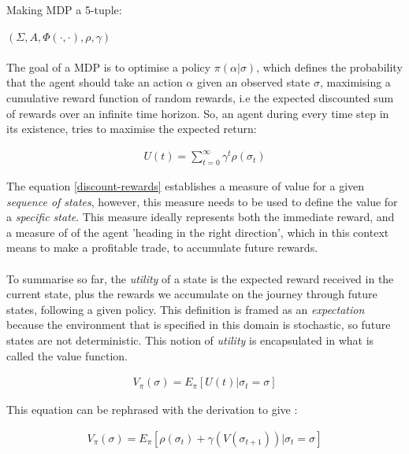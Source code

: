 \documentclass[ %
                    author={Ashwinder Khurana},
                supervisor={Prof Dave Cliff},
                    degree={MEng},
                     title={The Deeply Reinforced Trader},
                  subtitle={},
                      type={enterprise},
                      year={2020} ]{dissertation}
\begin{document}
Making MDP a 5-tuple:{$(\Sigma,A, \Phi(\cdot , \cdot), \rho,\gamma)$
\\
\\

\noindent
The goal of a MDP is to optimise a policy $\pi(\alpha | \sigma)$, which defines the probability that the agent should take an action $\alpha$ given an observed state $\sigma$, maximising a cumulative reward function of random rewards, i.e the expected discounted sum of rewards over an infinite time horizon. So, an agent during every time step in its existence, tries to maximise the expected return:

\begin{equation}
\label{discount-rewards}
\begin{split}
U(t) = \sum\limits^{\infty}_{t=0}{\gamma^{t} \rho(\sigma_t)}
\end{split}
\end{equation}

\vspace{0.5cm}
\noindent
The equation \ref{discount-rewards} establishes a measure of value for a given \textit{sequence of states}, however, this measure needs to be used to define the value for a \textit{specific state}. This measure ideally represents both the immediate reward, and a measure of of the agent 'heading in the right direction', which in this context means to make a profitable trade, to accumulate future rewards.
\\
\\
To summarise so far, the \textit{utility} of a state is the expected reward received in the current state, plus the rewards we accumulate on the journey through future states, following a given policy. This definition is framed as an \textit{expectation} because the environment that is specified in this domain is stochastic, so future states are not deterministic. This notion of \textit{utility} is encapsulated in what is called the value function. 

\begin{equation}
\label{expected-discounted-rewards}
\begin{split}
V_\pi (\sigma) = E_\pi [U(t) | \sigma_t = \sigma]
\end{split}
\end{equation}

\noindent 
This equation can be rephrased with the derivation\cite{rearrange-value-function https://www.jeremyjordan.me/markov-decision-process/} to give :

\begin{equation}
\label{expected-discounted-rewards-rephrased}
\begin{split}
V_\pi (\sigma) = E_\pi [\rho(\sigma_t) + \gamma(V( \sigma_{t+1})) | \sigma_t = \sigma ]
\end{split}
\end{equation}

}
\end{document}
